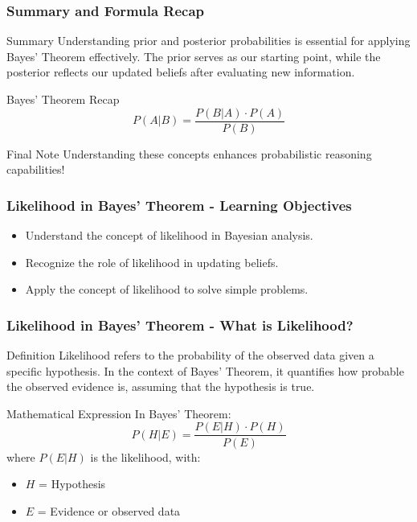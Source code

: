 \documentclass[aspectratio=169]{beamer}
\begin{document}
\begin{frame}[fragile]
    \frametitle{Summary and Formula Recap}
    \begin{block}{Summary}
        Understanding prior and posterior probabilities is essential for applying Bayes' Theorem effectively. 
        The prior serves as our starting point, while the posterior reflects our updated beliefs after evaluating new information.
    \end{block}
    \begin{block}{Bayes' Theorem Recap}
        \[
        P(A|B) = \frac{P(B|A) \cdot P(A)}{P(B)}
        \]
    \end{block}
    \begin{block}{Final Note}
        Understanding these concepts enhances probabilistic reasoning capabilities!
    \end{block}
\end{frame}

\begin{frame}[fragile]
    \frametitle{Likelihood in Bayes' Theorem - Learning Objectives}
    \begin{itemize}
        \item Understand the concept of likelihood in Bayesian analysis.
        \item Recognize the role of likelihood in updating beliefs.
        \item Apply the concept of likelihood to solve simple problems.
    \end{itemize}
\end{frame}

\begin{frame}[fragile]
    \frametitle{Likelihood in Bayes' Theorem - What is Likelihood?}
    \begin{block}{Definition}
        Likelihood refers to the probability of the observed data given a specific hypothesis. In the context of Bayes' Theorem, it quantifies how probable the observed evidence is, assuming that the hypothesis is true.
    \end{block}

    \begin{block}{Mathematical Expression}
    In Bayes' Theorem:
        \[
        P(H | E) = \frac{P(E | H) \cdot P(H)}{P(E)}
        \]
        where \( P(E | H) \) is the likelihood, with:
        \begin{itemize}
            \item \( H \) = Hypothesis
            \item \( E \) = Evidence or observed data
        \end{itemize}
    \end{block}
\end{frame}
\end{document}
